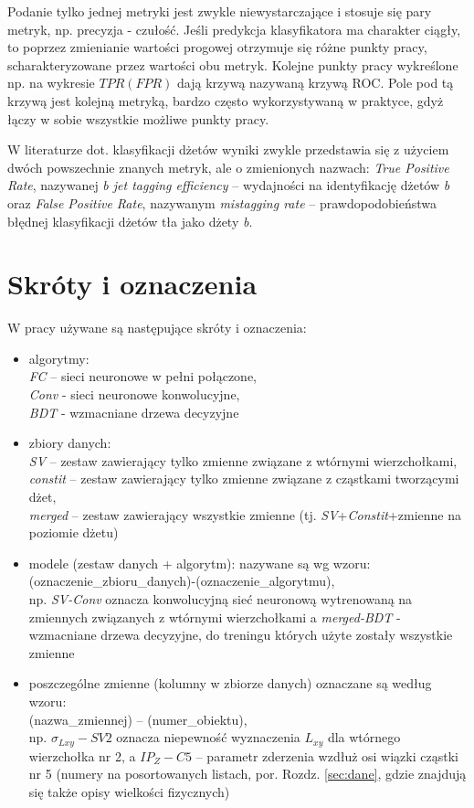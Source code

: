 \begin{appendices}
Podanie tylko jednej metryki jest zwykle niewystarczające i stosuje się pary metryk, np. precyzja - czułość. Jeśli predykcja klasyfikatora ma charakter ciągły, to poprzez zmienianie wartości progowej otrzymuje się różne punkty pracy, scharakteryzowane przez wartości obu metryk. Kolejne punkty pracy wykreślone np. na wykresie $TPR(FPR)$ dają krzywą nazywaną krzywą ROC. Pole pod tą krzywą  jest kolejną metryką, bardzo często wykorzystywaną w praktyce, gdyż łączy w sobie wszystkie możliwe punkty pracy.

W literaturze dot. klasyfikacji dżetów wyniki zwykle przedstawia się z użyciem dwóch powszechnie znanych metryk, ale o zmienionych nazwach:
\textit{True Positive Rate}, nazywanej \textit{b jet tagging efficiency} -- wydajności na identyfikację dżetów \textit{b} oraz \textit{False Positive Rate}, nazywanym \textit{mistagging rate}  -- prawdopodobieństwa błędnej klasyfikacji dżetów tła jako dżety \textit{b}.

\clearpage
\FloatBarrier
\section{Skróty i oznaczenia}
\label{sec:app:skroty}
W pracy używane są następujące skróty i oznaczenia: 
\begin{itemize}
	\item algorytmy: \\ \textit{FC} -- sieci neuronowe w pełni połączone,\\ \textit{Conv} - sieci neuronowe konwolucyjne,\\ \textit{BDT} - wzmacniane drzewa decyzyjne
	\item zbiory danych: \\ \textit{SV} -- zestaw zawierający tylko zmienne związane z wtórnymi wierzchołkami,\\ \textit{constit} -- zestaw zawierający tylko zmienne związane z cząstkami tworzącymi dżet,\\ \textit{merged} -- zestaw zawierający wszystkie zmienne (tj. \textit{SV}+\textit{Constit}+zmienne na poziomie dżetu)
	\item modele (zestaw danych + algorytm): nazywane są wg wzoru: \\ (oznaczenie\_zbioru\_danych)-(oznaczenie\_algorytmu), \\np. \textit{SV-Conv} oznacza konwolucyjną sieć neuronową wytrenowaną na zmiennych związanych z wtórnymi wierzchołkami a \textit{merged-BDT} - wzmacniane drzewa decyzyjne, do treningu których użyte zostały wszystkie zmienne
	\item poszczególne zmienne (kolumny w zbiorze danych) oznaczane są według wzoru: \\ (nazwa\_zmiennej) -- (numer\_obiektu), \\np. $\sigma_{Lxy} - SV2$ oznacza niepewność wyznaczenia $L_{xy}$ dla wtórnego wierzchołka nr 2, a $IP_Z - C5$ -- parametr zderzenia wzdłuż osi wiązki cząstki nr 5 (numery na posortowanych listach, por. Rozdz. \ref{sec:dane}, gdzie znajdują się także opisy wielkości fizycznych)
\end{itemize} 


\end{appendices}
